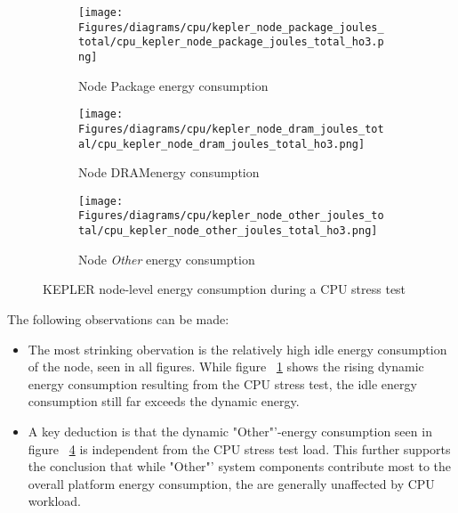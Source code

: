 \begin{figure}[H]
    \centering
    \begin{subfigure}{1\textwidth}
        \texttt{[image: Figures/diagrams/cpu/kepler\_node\_package\_joules\_total/cpu\_kepler\_node\_package\_joules\_total\_ho3.png]}
        \caption{Node Package energy consumption}
        \label{fig:cpu_kepler_node_package_joules_total}
    \end{subfigure}
    \begin{subfigure}{0.49\textwidth}
        \texttt{[image: Figures/diagrams/cpu/kepler\_node\_dram\_joules\_total/cpu\_kepler\_node\_dram\_joules\_total\_ho3.png]}
        \caption{Node DRAMenergy consumption}
        \label{fig:cpu_kepler_node_dram_joules_total}
    \end{subfigure}
    \begin{subfigure}{0.49\textwidth}
        \texttt{[image: Figures/diagrams/cpu/kepler\_node\_other\_joules\_total/cpu\_kepler\_node\_other\_joules\_total\_ho3.png]}
        \caption{Node \textit{Other} energy consumption}
        \label{fig:cpu_kepler_node_other_joules_total}
    \end{subfigure}
    \caption[Node-Level Energy Consumption]{KEPLER node-level energy consumption during a CPU stress test}
\end{figure}

The following observations can be made:
\begin{itemize}
\item The most strinking obervation is the relatively high idle energy consumption of the node, seen in all figures. While figure ~\ref{fig:cpu_kepler_node_package_joules_total} shows the rising dynamic energy consumption resulting from the CPU stress test, the idle energy consumption still far exceeds the dynamic energy.
\item A key deduction is that the dynamic "Other"'-energy consumption seen in figure ~\ref{fig:cpu_kepler_node_other_joules_total} is independent from the CPU stress test load. This further supports the conclusion that while "Other"' system components contribute most to the overall platform energy consumption, the are generally unaffected by CPU workload.
\end{itemize}

